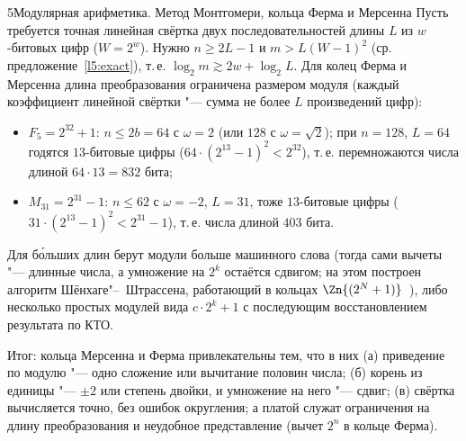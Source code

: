 \begin{lecture}{5}{Модулярная арифметика. Метод Монтгомери, кольца Ферма и Мерсенна}
Пусть требуется точная линейная свёртка двух последовательностей длины $L$ из $w$-битовых
цифр ($W = 2^w$). Нужно $n \ge 2L - 1$ и $m > L(W - 1)^2$ (ср. предложение~\ref{l5:exact}),
т.\,е. $\log_2 m \gtrsim 2w + \log_2 L$. Для колец Ферма и Мерсенна длина преобразования
ограничена размером модуля (каждый коэффициент линейной свёртки "--- сумма не более $L$
произведений цифр):
\begin{itemize}
  \item $F_5 = 2^{32} + 1$: $n \le 2b = 64$ с $\omega = 2$ (или $128$ с $\omega = \sqrt 2$);
    при $n = 128$, $L = 64$ годятся $13$-битовые цифры ($64 \cdot (2^{13} - 1)^2 < 2^{32}$),
    т.\,е. перемножаются числа длиной $64 \cdot 13 = 832$ бита;
  \item $M_{31} = 2^{31} - 1$: $n \le 62$ с $\omega = -2$, $L = 31$, тоже $13$-битовые цифры
    ($31 \cdot (2^{13} - 1)^2 < 2^{31} - 1$), т.\,е. числа длиной $403$ бита.
\end{itemize}
Для б\'{о}льших длин берут модули больше машинного слова (тогда сами вычеты "--- длинные числа,
а умножение на $2^k$ остаётся сдвигом; на этом построен алгоритм Шёнхаге"--~Штрассена,
работающий в кольцах $\Zn{(2^N + 1)}$~\cite{schonhage-strassen}), либо несколько простых модулей
вида $c \cdot 2^k + 1$ с последующим восстановлением результата по КТО.

Итог: кольца Мерсенна и Ферма привлекательны тем, что в них
(а) приведение по модулю "--- одно сложение или вычитание половин числа;
(б) корень из единицы "--- $\pm 2$ или степень двойки, и умножение на него "--- сдвиг;
(в) свёртка вычисляется точно, без ошибок округления; а платой служат ограничения на длину
преобразования и неудобное представление (вычет $2^n$ в кольце Ферма).



\checkyourselfsection


\end{lecture}
